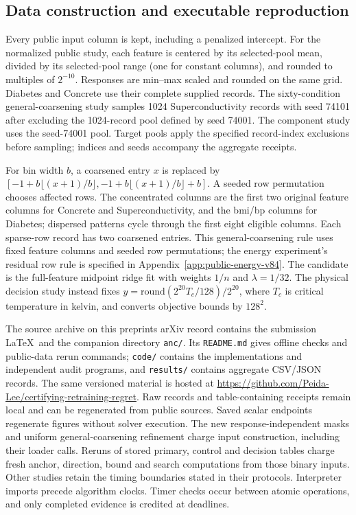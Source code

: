 \subsection{Data construction and executable reproduction}
Every public input column is kept, including a penalized intercept. For the normalized public study, each feature is centered by its selected-pool mean, divided by its selected-pool range (one for constant columns), and rounded to multiples of $2^{-10}$. Responses are min--max scaled and rounded on the same grid. Diabetes and Concrete use their complete supplied records. The sixty-condition general-coarsening study samples 1024 Superconductivity records with seed 74101 after excluding the 1024-record pool defined by seed 74001. The component study uses the seed-74001 pool. Target pools apply the specified record-index exclusions before sampling; indices and seeds accompany the aggregate receipts.

For bin width $b$, a coarsened entry $x$ is replaced by $[-1+b\lfloor(x+1)/b\rfloor,-1+b\lfloor(x+1)/b\rfloor+b]$. A seeded row permutation chooses affected rows. The concentrated columns are the first two original feature columns for Concrete and Superconductivity, and the bmi/bp columns for Diabetes; dispersed patterns cycle through the first eight eligible columns. Each sparse-row record has two coarsened entries. This general-coarsening rule uses fixed feature columns and seeded row permutations; the energy experiment's residual row rule is specified in Appendix~\ref{app:public-energy-v84}. The candidate is the full-feature midpoint ridge fit with weights $1/n$ and $\lambda=1/32$. The physical decision study instead fixes $y=\mathrm{round}(2^{20}T_c/128)/2^{20}$, where $T_c$ is critical temperature in kelvin, and converts objective bounds by $128^2$.

The source archive on this preprint\textquotesingle s arXiv record contains the submission \LaTeX\ and the companion directory \texttt{anc/}. Its \texttt{README.md} gives offline checks and public-data rerun commands; \texttt{code/} contains the implementations and independent audit programs, and \texttt{results/} contains aggregate CSV/JSON records. The same versioned material is hosted at \url{https://github.com/Peida-Lee/certifying-retraining-regret}. Raw records and table-containing receipts remain local and can be regenerated from public sources. Saved scalar endpoints regenerate figures without solver execution. The new response-independent masks and uniform general-coarsening refinement charge input construction, including their loader calls. Reruns of stored primary, control and decision tables charge fresh anchor, direction, bound and search computations from those binary inputs. Other studies retain the timing boundaries stated in their protocols. Interpreter imports precede algorithm clocks. Timer checks occur between atomic operations, and only completed evidence is credited at deadlines.

